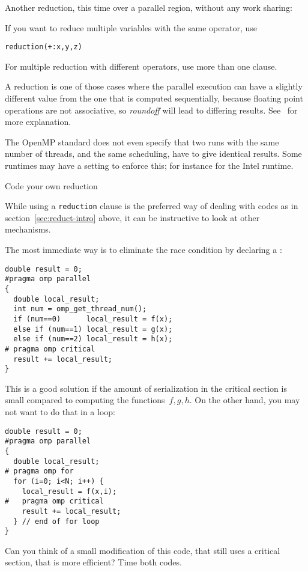 Another reduction, this time over a parallel region,
without any work sharing:
%

If you want to reduce multiple variables with the same operator, use
\begin{lstlisting}[language=omp]
reduction(+:x,y,z)
\end{lstlisting}
For multiple reduction with different operators, use more than one clause.

\begin{remark}
  A reduction is one of those cases where the parallel execution can have a slightly different
  value from the one that is computed sequentially, because floating point operations
  are not associative, so \emph{roundoff}
  will lead to differing results.
  See~ for more explanation.

  The OpenMP standard does not even specify that two runs with the same number of threads,
  and the same scheduling, have to give identical results.
  Some runtimes may have a setting to enforce this;
  for instance  for the Intel runtime.
\end{remark}

 {Code your own reduction}

While using a \lstinline[language=omp]{reduction} clause is the preferred way of dealing
with codes as in section~\ref{sec:reduct-intro} above,
it can be instructive to look at other mechanisms.

The most immediate way is to eliminate the race condition
by declaring a :
\begin{lstlisting}[language=omp]
double result = 0;
#pragma omp parallel
{
  double local_result;
  int num = omp_get_thread_num();
  if (num==0)      local_result = f(x);
  else if (num==1) local_result = g(x);
  else if (num==2) local_result = h(x);
# pragma omp critical
  result += local_result;
}
\end{lstlisting}

This is a good solution if the amount of serialization in the critical section
is small compared to computing the functions~$f,g,h$. On the other hand, you
may not want to do that in a loop:
\begin{lstlisting}[language=omp]
double result = 0;
#pragma omp parallel
{
  double local_result;
# pragma omp for
  for (i=0; i<N; i++) {
    local_result = f(x,i);
#   pragma omp critical
    result += local_result;
  } // end of for loop
}
\end{lstlisting}
\begin{exercise}
  Can you think of a small modification of this code, that still uses a critical section,
  that is more efficient? Time both codes.
\end{exercise}

